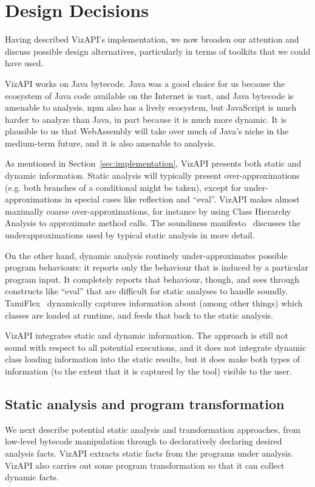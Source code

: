 \section{Design Decisions}
\label{sec:design-decisions}

Having described VizAPI's implementation, we now broaden our attention
and discuss possible design alternatives, particularly in terms of toolkits
that we could have used.

VizAPI works on Java bytecode. Java was a good choice for us
because the ecosystem of Java code available on the
Internet is vast, and Java bytecode is amenable to analysis. 
npm also has a lively ecosystem, but JavaScript is much harder to
analyze than Java, in part because it is much more dynamic. It is plausible
to us that WebAssembly will take over much of Java's niche in the medium-term
future, and it is also amenable to analysis.

As mentioned in Section~\ref{sec:implementation}, VizAPI presents both
static and dynamic information. Static analysis will typically present
over-approximations (e.g. both branches of a conditional might be
taken), except for under-approximations in special cases like
reflection and ``eval''. VizAPI makes almost maximally coarse
over-approximations, for instance by using Class Hierarchy Analysis to
approximate method calls. The soundiness
manifesto~\cite{livshits15:_in_defen_sound} discusses the
underapproximations used by typical static analysis in more detail.

On the other hand, dynamic analysis routinely under-approximates possible
program behaviours: it reports only the behaviour that is induced by
a particular program input. It completely reports that behaviour, though,
and sees through constructs like ``eval'' that are difficult for static analyses to
handle soundly. TamiFlex~\cite{bodden11:_tamin_reflec} dynamically captures
information about (among other things) which classes are loaded at runtime,
and feeds that back to the static analysis.

VizAPI integrates static and dynamic information. The approach is
still not sound with respect to all potential executions, and it does
not integrate dynamic class loading information into the static
results, but it does make both types of information (to the extent that it is 
captured by the tool) visible to the user.

\subsection{Static analysis and program transformation}
We next describe potential static analysis and transformation
approaches, from low-level bytecode manipulation through to
declaratively declaring desired analysis facts. VizAPI extracts static
facts from the programs under analysis. VizAPI also carries out some
program transformation so that it can collect dynamic facts.

